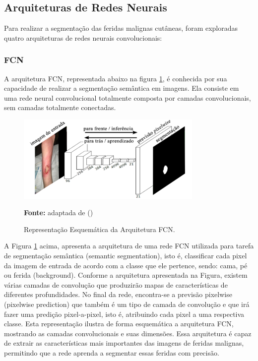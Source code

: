 \subsection{Arquiteturas de Redes Neurais}
    Para realizar a segmentação das feridas malignas cutâneas, foram exploradas quatro arquiteturas de redes neurais convolucionais:

    \subsubsection{FCN}
    
        A arquitetura \ac{FCN}, representada abaixo na figura \ref{fig:arquiteturaFCN},  é conhecida por sua capacidade de realizar a segmentação semântica em imagens. Ela consiste em uma rede neural convolucional totalmente composta por camadas convolucionais, sem camadas totalmente conectadas. 

        \clearpage
        
        \begin{figure}[htbp]
            \centering
            \caption{Representação Esquemática da Arquitetura \ac{FCN}.}
            \includegraphics[width=0.8\textwidth]{img/arquitetura_FCN.png}
            \label{fig:arquiteturaFCN}
            \par\medskip\textbf{Fonte:} adaptada de (\cite{long2015fully})
        \end{figure}
        
        A Figura \ref{fig:arquiteturaFCN} acima, apresenta a arquitetura de uma rede \ac{FCN} utilizada para tarefa de segmentação semântica (semantic segmentation), isto é, classificar cada pixel da imagem de entrada de acordo com a classe que ele pertence, sendo: cama, pé ou ferida (background). Conforme a arquitetura apresentada na Figura, existem várias camadas de convolução que produzirão mapas de características de diferentes profundidades. No final da rede, encontra-se a previsão pixelwise (pixelwise prediction) que também é um tipo de camada de convolução e que irá fazer uma predição pixel-a-pixel, isto é, atribuindo cada pixel a uma respectiva classe. Esta representação ilustra de forma esquemática a arquitetura \ac{FCN}, mostrando as camadas convolucionais e suas dimensões. Essa arquitetura é capaz de extrair as características mais importantes das imagens de feridas malignas, permitindo que a rede aprenda a segmentar essas feridas com precisão. 



